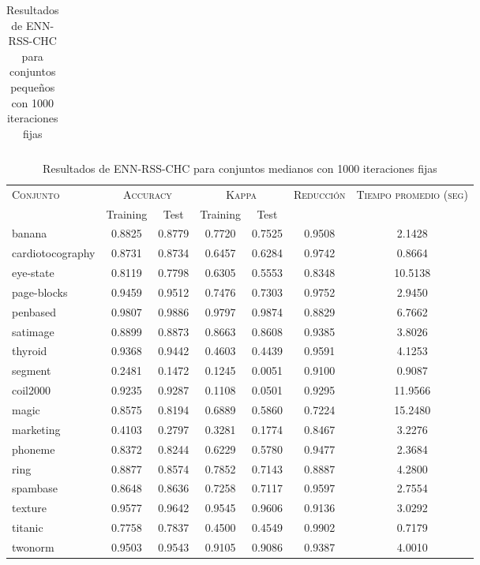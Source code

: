 \begin{table}[]
\begin{tabular}{l c c c c c c}
\hline
\end{tabular}
\caption{Resultados de ENN-RSS-CHC para conjuntos pequeños con 1000 iteraciones fijas}
\label{res-peq-ENN-RSS-CHC}
\end{table}


\begin{table}[]
\centering
\begin{tabular}{l c c c c c c}
\hline
\multirow{2}{*}{\textsc{Conjunto}}
	& \multicolumn{2}{c}{\textsc{Accuracy}}
	& \multicolumn{2}{c}{\textsc{Kappa}}
	& \textsc{Reducción}
	& \textsc{Tiempo promedio (seg)} \\
	& Training & Test
	& Training & Test \\ 
\hline
\hline

banana & 0.8825 & 0.8779 & 0.7720 & 0.7525 & 0.9508 & 2.1428 \\
cardiotocography & 0.8731 & 0.8734 & 0.6457 & 0.6284 & 0.9742 & 0.8664 \\
eye-state & 0.8119 & 0.7798 & 0.6305 & 0.5553 & 0.8348 & 10.5138 \\
page-blocks & 0.9459 & 0.9512 & 0.7476 & 0.7303 & 0.9752 & 2.9450 \\
penbased & 0.9807 & 0.9886 & 0.9797 & 0.9874 & 0.8829 & 6.7662 \\
satimage & 0.8899 & 0.8873 & 0.8663 & 0.8608 & 0.9385 & 3.8026 \\
thyroid & 0.9368 & 0.9442 & 0.4603 & 0.4439 & 0.9591 & 4.1253 \\
segment & 0.2481 & 0.1472 & 0.1245 & 0.0051 & 0.9100 & 0.9087 \\
coil2000 & 0.9235 & 0.9287 & 0.1108 & 0.0501 & 0.9295 & 11.9566 \\
magic & 0.8575 & 0.8194 & 0.6889 & 0.5860 & 0.7224 & 15.2480 \\
marketing & 0.4103 & 0.2797 & 0.3281 & 0.1774 & 0.8467 & 3.2276 \\
phoneme & 0.8372 & 0.8244 & 0.6229 & 0.5780 & 0.9477 & 2.3684 \\
ring & 0.8877 & 0.8574 & 0.7852 & 0.7143 & 0.8887 & 4.2800 \\
spambase & 0.8648 & 0.8636 & 0.7258 & 0.7117 & 0.9597 & 2.7554 \\
texture & 0.9577 & 0.9642 & 0.9545 & 0.9606 & 0.9136 & 3.0292 \\
titanic & 0.7758 & 0.7837 & 0.4500 & 0.4549 & 0.9902 & 0.7179 \\
twonorm & 0.9503 & 0.9543 & 0.9105 & 0.9086 & 0.9387 & 4.0010 \\

\hline
\end{tabular}
\caption{Resultados de ENN-RSS-CHC para conjuntos medianos con 1000 iteraciones fijas}
\label{res-med-ENN-RSS-CHC}
\end{table}


